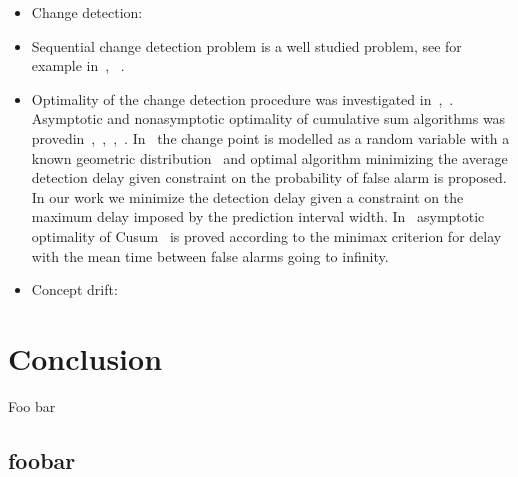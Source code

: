 \documentclass[licentiate,utf8,lot,loar,lof,shortloft,index]{jydiss}
\begin{document}
\begin{itemize}
  \item Change detection:~\cite{basseville1993detection}

  \item Sequential change detection problem is a well studied problem, see for example in~\cite{tartakovsky2014sequential}, ~\cite{plasse2021streaming}. 

  \item Optimality of the change detection procedure was investigated in~\cite{Page1954},~\cite{Shiryaev2010,Shiryaev1961,Shiryaev1963}.
  Asymptotic and nonasymptotic optimality of cumulative sum algorithms was provedin~\cite{lorden1971procedures},~\cite{moustakides1986optimal},~\cite{moustakides2004optimality},~\cite{ritov1990decision}. In~\cite{Shiryaev1963,shiryaev2007optimal} the change point is modelled as a random variable with a known geometric distribution~\cite{veeravalli2014quickest} and optimal algorithm minimizing the average detection delay given constraint on the probability of false alarm is proposed. In our work we minimize the detection delay given a constraint on the maximum delay imposed by the prediction interval width. In~\cite{lorden1971procedures} asymptotic optimality of Cusum~\cite{Page1954} is proved according to the minimax criterion for delay with the mean time between false alarms going to infinity.

  \item Concept drift:
\end{itemize}

\chapter{Conclusion}

\tailmatter
\finnishsummary
Foo bar


\appendices
{}
\section{foobar}

\backmatter


\printindex
\end{document}

